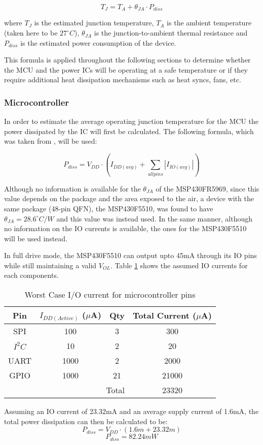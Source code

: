 \[T_J = T_A + \theta_{JA} \cdot P_{diss}\]

where $T_J$ is the estimated junction temperature, $T_A$ is the ambient temperature (taken here to be $27^\circ C$), $\theta_{JA}$ is the junction-to-ambient thermal resistance and $P_{diss}$ is the estimated power consumption of the device. 

This formula is applied throughout the following sections to determine whether the MCU and the power ICs will be operating at a safe temperature or if they require additional heat dissipation mechanisms such as heat syncs, fans, etc.

\subsubsection{Microcontroller}
In order to estimate the average operating junction temperature for the MCU the power dissipated by the IC will first be calculated.  The following formula, which was taken from \cite[419]{Jimenez2013}, will be used:

\[P_{diss} = V_{DD} \cdot \left(I_{DD(avg)} + \sum_{allpins} |I_{IO(avg)}| \right)\]

Although no information is available for the $\theta_{JA}$ of the MSP430FR5969, since this value depends on the package and the area exposed to the air, a device with the same package (48-pin QFN), the MSP430F5510, was found to have $\theta_{JA} = 28.6^\circ C/W$ and this value was instead used.  In the same manner, although no information on the IO currents is available, the ones for the MSP430F5510 will be used instead.

In full drive mode, the MSP430F5510 can output upto 45mA through its IO pins while still maintaining a valid $V_{OL}$.    Table \ref{tab:ioCurrents} shows the assumed IO currents for each components.
\begin{table}[H]
  \centering
  \caption{Worst Case I/O current for microcontroller pins}
    \begin{tabular}{|c|c|c|c|}
     \hline
     \rowcolor{Gray}
    Pin & $I_{DD(Active)}$ ($\mu$A) & Qty & Total Current ($\mu$A)\\
     \hline \hline
    SPI & 100  & 3 & 300 \\ \hline
   	$I^2C$ & 10 & 2 & 20  \\ \hline
    UART & 1000 & 2 & 2000 \\ \hline
    GPIO  & 1000 & 21 & 21000\\ \hline \hline
    \multicolumn{3}{|r|}{Total} & 23320 \\ \hline 
    \end{tabular}%
  \label{tab:ioCurrents}%
\end{table}%
Assuming an IO current of 23.32mA and an average supply current of 1.6mA, the total power dissipation can then be calculated to be:
\[P_{diss} = V_{DD} \cdot \left(1.6m + 23.32m \right)\]
\[\boxed{P_{diss} = 82.24mW}\]


